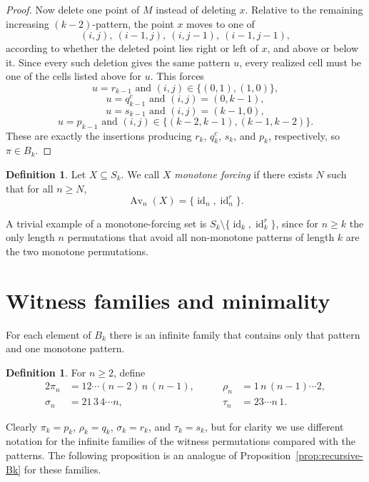 \documentclass[11pt]{amsart}
\newcommand{\Sym}{S}
\newcommand{\Av}{\operatorname{Av}}
\newcommand{\id}{\operatorname{id}}
\theoremstyle{plain}
\theoremstyle{definition}
\newtheorem{definition}[theorem]{Definition}
\theoremstyle{remark}
\begin{document}
\begin{proof}
  Now delete one point of $M$ instead of deleting $x$.  Relative to the remaining increasing
  $(k-2)$-pattern, the point $x$ moves to one of
  \[
    (i,j),\ (i-1,j),\ (i,j-1),\ (i-1,j-1),
  \]
  according to whether the deleted point lies right or left of $x$, and above or below it.  Since
  every such deletion gives the same pattern $u$, every realized cell must be one of the cells listed
  above for $u$.  This forces
  \[
    u=r_{k-1}\text{ and }(i,j)\in\{(0,1),(1,0)\},
  \]
  \[
    u=q_{k-1}^c\text{ and }(i,j)=(0,k-1),
  \]
  \[
    u=s_{k-1}\text{ and }(i,j)=(k-1,0),
  \]
  \[
    u=p_{k-1}\text{ and }(i,j)\in\{(k-2,k-1),(k-1,k-2)\}.
  \]
  These are exactly the insertions producing $r_k$, $q_k^c$, $s_k$, and $p_k$, respectively, so
  $\pi \in B_k$.
\end{proof}

\begin{definition}
  Let $X \subseteq \Sym_k$.  We call $X$ \emph{monotone forcing} if there exists $N$ such that for all
  $n \geq N$,
  \[
    \Av_n(X)=\{\id_n,\id_n^r\}.
  \]
\end{definition}

A trivial example of a monotone-forcing set is $\Sym_k \setminus \{\id_k, \id_k^r\}$, since
for $n \geq k$ the only length $n$ permutations that avoid all non-monotone patterns of length $k$ are the two monotone permutations.

\section{Witness families and minimality}

For each element of $B_k$ there is an infinite family that contains only that pattern and one
monotone pattern.

\begin{definition} \label{def:Bk-witnesses}
  For $n \geq 2$, define
  \begin{alignat*}{2}
    \pi_n    & = 12\cdots(n-2)\,n\,(n-1), \qquad & \rho_n & = 1\,n\,(n-1)\cdots 2, \\
    \sigma_n & = 21\,3\,4\cdots n,               & \tau_n & = 23\cdots n\,1.
  \end{alignat*}
\end{definition}

Clearly $\pi_k = p_k$, $\rho_k = q_k$, $\sigma_k = r_k$, and $\tau_k = s_k$, but for clarity we use different notation
for the infinite families of the witness permutations compared with the patterns. The following proposition is an
analogue of Proposition~\ref{prop:recursive-Bk} for these families.
\end{document}
